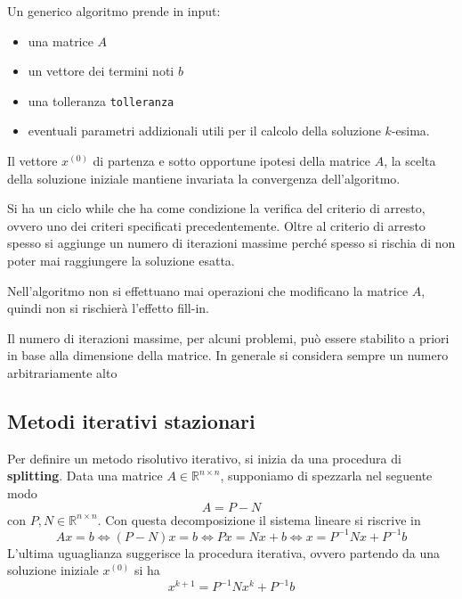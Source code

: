 Un generico algoritmo prende in input:
\begin{itemize}
    \item una matrice $A$
    \item un vettore dei termini noti $b$
    \item una tolleranza \texttt{tolleranza}
    \item eventuali parametri addizionali utili per il calcolo della soluzione 
    $k$-esima.
\end{itemize}

Il vettore $x^{(0)}$ di partenza e sotto opportune ipotesi della matrice $A$, la 
scelta della soluzione iniziale mantiene invariata la convergenza dell'algoritmo.

Si ha un ciclo while che ha come condizione la verifica del criterio di arresto,
ovvero uno dei criteri specificati precedentemente. Oltre al criterio di arresto 
spesso si aggiunge un numero di iterazioni massime perché spesso si rischia di 
non poter mai raggiungere la soluzione esatta.

Nell'algoritmo non si effettuano mai operazioni che modificano la matrice $A$,
quindi non si rischierà l'effetto fill-in.

\begin{nota}
    Il numero di iterazioni massime, per alcuni problemi, può essere stabilito
    a priori in base alla dimensione della matrice. In generale si considera
    sempre un numero arbitrariamente alto
\end{nota}




\subsection{Metodi iterativi stazionari}
Per definire un metodo risolutivo iterativo, si inizia da una procedura di \textbf{splitting}.
Data una matrice $A\in \mathbb{R}^{n\times n}$, supponiamo di spezzarla nel seguente 
modo
$$A=P-N$$
con $P,N\in \mathbb{R}^{n\times n}$. Con questa decomposizione il sistema lineare 
si riscrive in
$$Ax= b \iff (P-N)x= b \iff Px = Nx+b \iff x= P^{-1}Nx+P^{-1}b$$
L'ultima uguaglianza suggerisce la procedura iterativa, ovvero partendo da una 
soluzione iniziale $x^{(0)}$ si ha
\begin{equation}
    x^{k+1} =  P^{-1}Nx^{k}+P^{-1}b
    \label{eq:iterativo_stazionario}
\end{equation}

